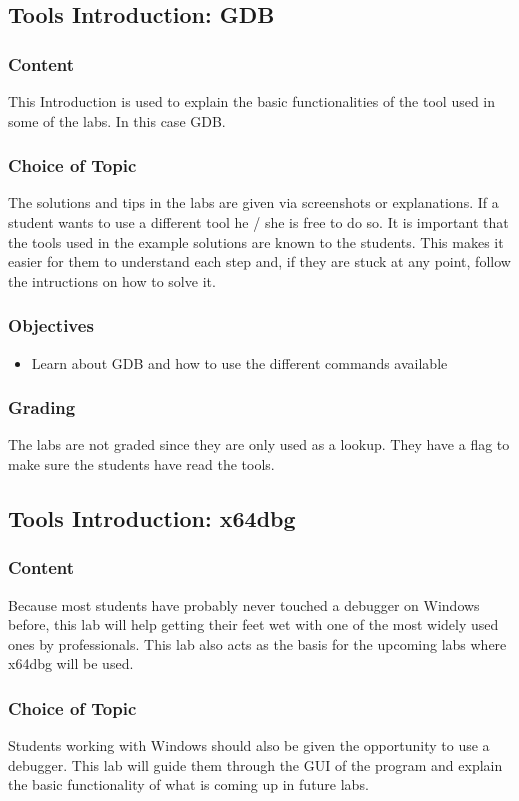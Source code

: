 \subsection{Tools Introduction: GDB}
\subsubsection*{Content}
This Introduction is used to explain the basic functionalities of the tool used in some of the labs. In this case GDB.
\subsubsection*{Choice of Topic}
The solutions and tips in the labs are given via screenshots or explanations. If a student wants to use a different tool he / she is free to do so. It is important that the tools used in the example solutions are known to the students. This makes it easier for them to understand each step and, if they are stuck at any point, follow the intructions on how to solve it. 
\subsubsection*{Objectives}
\begin{itemize}
    \item Learn about GDB and how to use the different commands available
\end{itemize}
\subsubsection*{Grading}
The labs are not graded since they are only used as a lookup. They have a flag to make sure the students have read the tools.

\subsection{Tools Introduction: x64dbg}
\subsubsection*{Content}
Because most students have probably never touched a debugger on Windows before, this lab will help getting their feet wet with one of the most widely used ones by professionals.
This lab also acts as the basis for the upcoming labs where x64dbg will be used.
\subsubsection*{Choice of Topic}
Students working with Windows should also be given the opportunity to use a debugger. This lab will guide them through the GUI of the program and explain the basic functionality of what is coming up in future labs.
